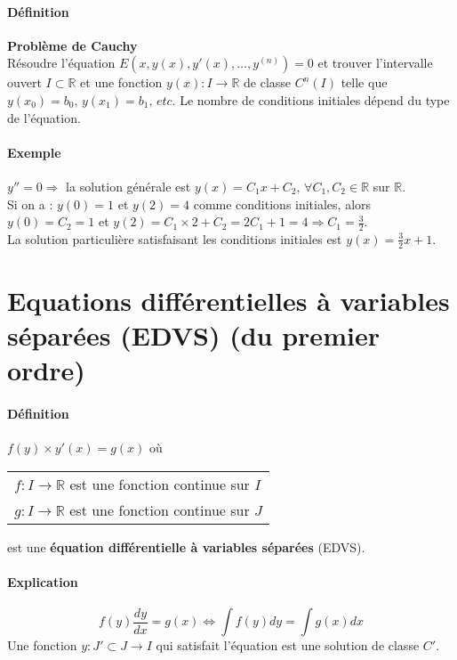 \message{ !name(analyse-02.tex)}\documentclass[1Opt]{report}
\begin{document}
\paragraph{Définition}
\textbf{Problème de Cauchy}\\
Résoudre l'équation $E\left(x,y(x),y'(x),\ldots,y^{(n)}\right)=0$ et trouver
l'intervalle ouvert $I\subset{\mathbb R}$ et une fonction
$y(x):I\rightarrow{\mathbb R}$ de classe $C^n(I)$ telle que
$y(x_0)=b_0,\,y(x_1)=b_1,\, etc$. Le nombre de conditions initiales dépend du
type de l'équation.

\paragraph{Exemple}
$y''=0\Rightarrow$ la solution générale est
$y(x)=C_1x+C_2,\,\forall C_1,C_2\in{\mathbb R}$ sur ${\mathbb R}$. \\
Si on a : $y(0)=1$ et $y(2)=4$ comme conditions initiales, alors $y(0)=C_2=1$ et
$y(2)=C_1\times 2+C_2=2C_1+1=4\Rightarrow C_1=\frac{3}{2}$.\\
La solution particulière satisfaisant les conditions initiales est $y(x)=
\frac{3}{2}x+1$.

\section{Equations différentielles à variables séparées (EDVS) (du premier ordre)}

\paragraph{Définition}
$f(y)\times y'(x)=g(x)$ où
\begin{tabular}{l}
  $f:I\rightarrow{\mathbb R}$ est une fonction continue sur $I$ \\
  $g:I\rightarrow{\mathbb R}$ est une fonction continue sur $J$ \\
\end{tabular}
est une \textbf{équation différentielle à variables séparées} (EDVS).

\paragraph{Explication}
\[ f(y)\frac{dy}{dx}=g(x)\Leftrightarrow\int{f(y)dy}=\int{g(x)dx}\]
Une fonction $y:J'\subset J\rightarrow I$ qui satisfait l'équation est une
solution de classe $C'$.
\end{document}
